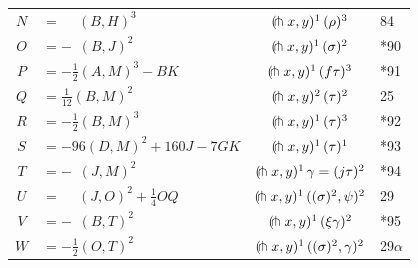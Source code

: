 \documentclass[11pt,a4paper]{article}
\begin{document}
\begin{center}
\begin{tabular}{clcl}
$N$ & $= \phantom{-}(B,H)^{3}$ & $(\hspace{-0.2em}\pitchfork x, y)^{1}\, (\rho)^{3}$ & 84\\[0.3em]
$O$ & $= -\phantom{\frac{1}{2}}(B,J)^{2}$ & $(\hspace{-0.2em}\pitchfork x, y)^{1}\, (\sigma)^{2}$ & *90\\[0.3em]
$P$ & $= -\frac{1}{2}(A,M)^{3} - BK$ & $(\hspace{-0.2em}\pitchfork x, y)^{1}\, (f\tau)^{3}$ & *91\\[0.3em]
$Q$ & $= \frac{1}{12}(B,M)^{2}$ & $(\hspace{-0.2em}\pitchfork x, y)^{2}\, (\tau)^{2}$ & 25\\[0.3em]
$R$ & $= -\frac{1}{2}(B,M)^{3}$ & $(\hspace{-0.2em}\pitchfork x, y)^{1}\, (\tau)^{3}$ & *92\\[0.3em]
$S$ & $= -96(D,M)^{2} + 160J - 7GK$ & $(\hspace{-0.2em}\pitchfork x, y)^{1}\, (\tau)^{1}$ & *93\\[0.3em]
$T$ & $= -\phantom{\frac{1}{2}}(J,M)^{2}$ & $(\hspace{-0.2em}\pitchfork x, y)^{1}\, \gamma = (j\tau)^{2}$ & *94\\[0.3em]
$U$ & $= \phantom{-}(J,O)^{2} + \frac{1}{4}OQ$ & $(\hspace{-0.2em}\pitchfork x, y)^{1}\, ((\sigma)^{2},\psi)^{2}$ & 29\\[0.3em]
$V$ & $= -\phantom{\frac{1}{2}}(B,T)^{2}$ & $(\hspace{-0.2em}\pitchfork x, y)^{1}\, (\xi\gamma)^{2}$ & *95\\[0.3em]
$W$ & $= -\frac{1}{2}(O,T)^{2}$ & $(\hspace{-0.2em}\pitchfork x, y)^{1}\, ((\sigma)^{2},\gamma)^{2}$ & 29$\alpha$
\end{tabular}
\end{center}

\newpage
\setcounter{page}{342}
\end{document}
